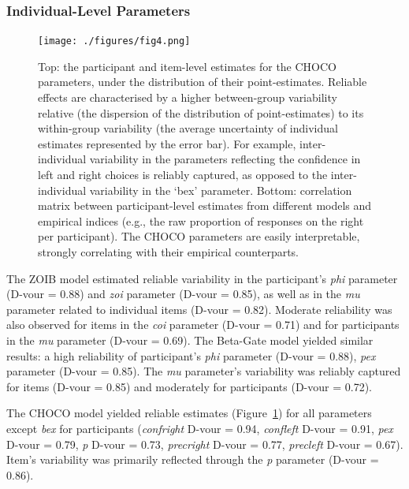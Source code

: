 \documentclass[
  jou,
  floatsintext,
  longtable,
  nolmodern,
  notxfonts,
  notimes,
  colorlinks=true,linkcolor=blue,citecolor=blue,urlcolor=blue]{apa7}
\begin{document}
\subsubsection{Individual-Level
Parameters}\label{individual-level-parameters}

\begin{figure}[!htbp]

{\caption{{Top: the participant and item-level estimates for the CHOCO
parameters, under the distribution of their point-estimates. Reliable
effects are characterised by a higher between-group variability relative
(the dispersion of the distribution of point-estimates) to its
within-group variability (the average uncertainty of individual
estimates represented by the error bar). For example, inter-individual
variability in the parameters reflecting the confidence in left and
right choices is reliably captured, as opposed to the inter-individual
variability in the `bex' parameter. Bottom: correlation matrix between
participant-level estimates from different models and empirical indices
(e.g., the raw proportion of responses on the right per participant).
The CHOCO parameters are easily interpretable, strongly correlating with
their empirical counterparts.}{\label{fig-four}}}}

\begin{center}
\texttt{[image: ./figures/fig4.png]}
\end{center}

\end{figure}

The ZOIB model estimated reliable variability in the participant's
\emph{phi} parameter (D-vour = 0.88) and \emph{zoi} parameter (D-vour =
0.85), as well as in the \emph{mu} parameter related to individual items
(D-vour = 0.82). Moderate reliability was also observed for items in the
\emph{coi} parameter (D-vour = 0.71) and for participants in the
\emph{mu} parameter (D-vour = 0.69). The Beta-Gate model yielded similar
results: a high reliability of participant's \emph{phi} parameter
(D-vour = 0.88), \emph{pex} parameter (D-vour = 0.85). The \emph{mu}
parameter's variability was reliably captured for items (D-vour = 0.85)
and moderately for participants (D-vour = 0.72).

The CHOCO model yielded reliable estimates (Figure~\ref{fig-four}) for
all parameters except \emph{bex} for participants (\emph{confright}
D-vour = 0.94, \emph{confleft} D-vour = 0.91, \emph{pex} D-vour = 0.79,
\emph{p} D-vour = 0.73, \emph{precright} D-vour = 0.77, \emph{precleft}
D-vour = 0.67). Item's variability was primarily reflected through the
\emph{p} parameter (D-vour = 0.86).
\end{document}
